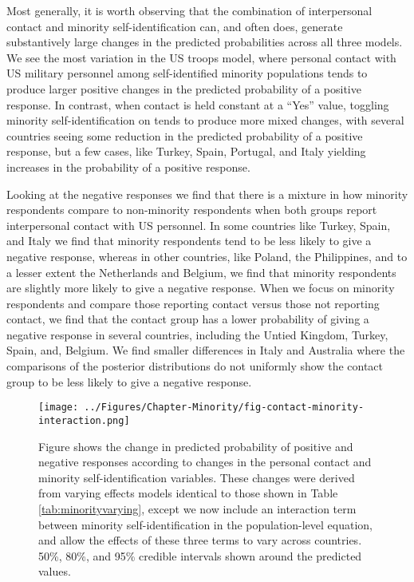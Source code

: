 Most generally, it is worth observing that the combination of interpersonal contact and minority self-identification can, and often does, generate substantively large changes in the predicted probabilities across all three models. We see the most variation in the US troops model, where personal contact with US military personnel among self-identified minority populations tends to produce larger positive changes in the predicted probability of a positive response. In contrast, when contact is held constant at a ``Yes'' value, toggling minority self-identification on tends to produce more mixed changes, with several countries seeing some reduction in the predicted probability of a positive response, but a few cases, like Turkey, Spain, Portugal, and Italy yielding increases in the probability of a positive response. 

Looking at the negative responses we find that there is a mixture in how minority respondents compare to non-minority respondents when both groups report interpersonal contact with US personnel. In some countries like Turkey, Spain, and Italy we find that minority respondents tend to be less likely to give a negative response, whereas in other countries, like Poland, the Philippines, and to a lesser extent the Netherlands and Belgium, we find that minority respondents are slightly more likely to give a negative response. When we focus on minority respondents and compare those reporting contact versus those not reporting contact, we find that the contact group has a lower probability of giving a negative response in several countries, including the Untied Kingdom, Turkey, Spain, and, Belgium. We find smaller differences in Italy and Australia where the comparisons of the posterior distributions do not uniformly show the contact group to be less likely to give a negative response.

\begin{figure}[t!]
	\centering\texttt{[image: ../Figures/Chapter-Minority/fig-contact-minority-interaction.png]}
	\caption{Figure shows the change in predicted probability of positive and negative responses according to changes in the personal contact and minority self-identification variables. These changes were derived from varying effects models identical to those shown in Table \ref{tab:minorityvarying}, except we now include an interaction term between minority self-identification in the population-level equation, and allow the effects of these three terms to vary across countries. 50\%, 80\%, and 95\% credible intervals shown around the predicted values.}
	\label{fig:minorityinteractionvaryingeffect}
\end{figure}


